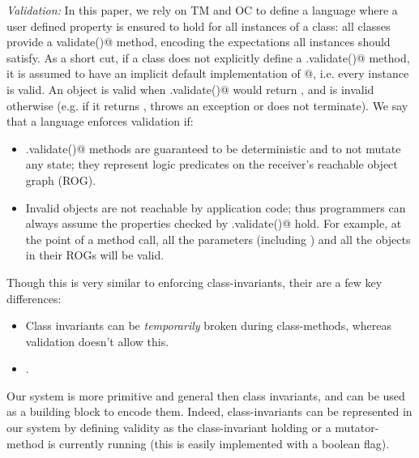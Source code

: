 \loseSpace
\noindent\textit{Validation:}
\label{s:validation}
In this paper, we rely on TM and OC to define a language where a user defined property is ensured to hold for all instances of a class:
all classes provide a \Q@Bool validate()@ method, encoding the expectations all instances should satisfy.
As a short cut, if a class does not explicitly define a
\Q@.validate()@ method, it is assumed to have an implicit default implementation of @, i.e. every instance is valid.
An object \Q@o@ is valid when \Q@o.validate()@ would return \Q@true@, and is invalid otherwise (e.g. if it returns \Q@false@, throws an exception or does not terminate).
We say that a language enforces validation if:
\begin{itemize}
\item \Q@.validate()@ methods are guaranteed to be deterministic and to not mutate any state; they represent logic predicates on the receiver’s reachable object graph (ROG).
\item Invalid objects are not reachable by application code; thus programmers can always assume the properties checked by \Q@.validate()@ hold.
For example, at the point of a method call, all the parameters (including \Q@this@) and all the objects in their ROGs will be valid.
\end{itemize}

\noindent Though this is very similar to enforcing class-invariants, their are a few key differences:
\begin{itemize}
\item Class invariants can be \emph{temporarily} broken during class-methods, whereas validation doesn’t allow this.
\item {}.
\end{itemize}
\noindent Our system is more primitive and general then class invariants, and can be used as a building block to encode 
them.
Indeed, class-invariants can be represented in our system by defining validity as 
the class-invariant holding or a mutator-method is currently running (this is easily implemented with a boolean flag).

